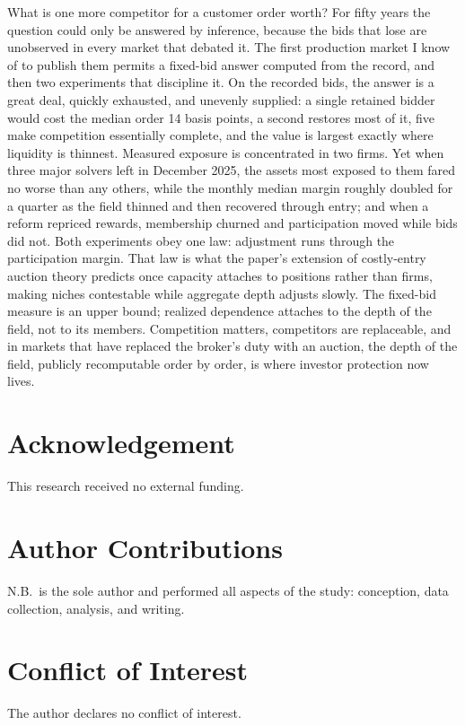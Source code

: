 \documentclass[11pt]{article}
\theoremstyle{plain}
\theoremstyle{definition}
\theoremstyle{remark}
\begin{document}
What is one more competitor for a customer order worth? For fifty years the question could only be answered by inference, because the bids that lose are unobserved in every market that debated it. The first production market I know of to publish them permits a fixed-bid answer computed from the record, and then two experiments that discipline it. On the recorded bids, the answer is a great deal, quickly exhausted, and unevenly supplied: a single retained bidder would cost the median order 14 basis points, a second restores most of it, five make competition essentially complete, and the value is largest exactly where liquidity is thinnest. Measured exposure is concentrated in two firms. Yet when three major solvers left in December 2025, the assets most exposed to them fared no worse than any others, while the monthly median margin roughly doubled for a quarter as the field thinned and then recovered through entry; and when a reform repriced rewards, membership churned and participation moved while bids did not. Both experiments obey one law: adjustment runs through the participation margin. That law is what the paper's extension of costly-entry auction theory predicts once capacity attaches to positions rather than firms, making niches contestable while aggregate depth adjusts slowly. The fixed-bid measure is an upper bound; realized dependence attaches to the depth of the field, not to its members. Competition matters, competitors are replaceable, and in markets that have replaced the broker's duty with an auction, the depth of the field, publicly recomputable order by order, is where investor protection now lives.

\section*{Acknowledgement}

This research received no external funding.

\section*{Author Contributions}

N.B.\ is the sole author and performed all aspects of the study: conception, data collection, analysis, and writing.

\section*{Conflict of Interest}

The author declares no conflict of interest.



\end{document}
